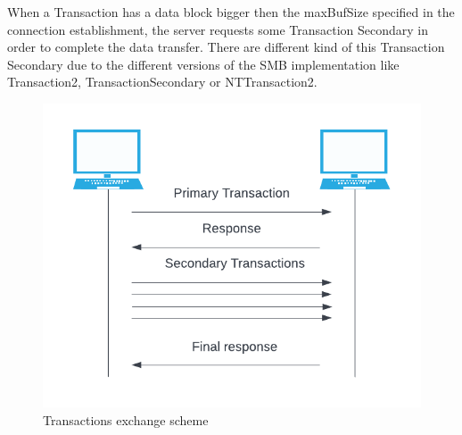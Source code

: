 When a Transaction has a data block bigger then the maxBufSize specified in the connection establishment, the server requests some Transaction Secondary in order
to complete the data transfer.
There are different kind of this Transaction Secondary due to the different versions of the SMB implementation like Transaction2, TransactionSecondary or NTTransaction2.
\begin{figure}[ht!]
    \centering
      \includegraphics[]{images/transactions_scheme.png}
      \caption{Transactions exchange scheme}
\end{figure}
